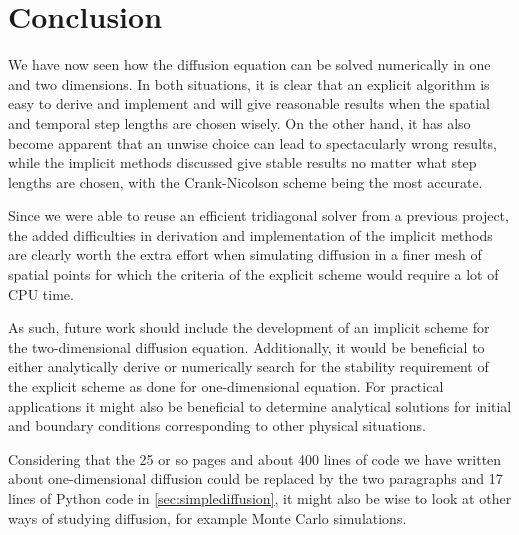 \section{Conclusion}
We have now seen how the diffusion equation can be solved numerically in one and two dimensions. In both situations, it is clear that an explicit algorithm is easy to derive and implement and will give reasonable results when the spatial and temporal step lengths are chosen wisely. On the other hand, it has also become apparent that an unwise choice can lead to spectacularly wrong results, while the implicit methods discussed give stable results no matter what step lengths are chosen, with the Crank-Nicolson scheme being the most accurate.

Since we were able to reuse an efficient tridiagonal solver from a previous project, the added difficulties in derivation and implementation of the implicit methods are clearly worth the extra effort when simulating diffusion in a finer mesh of spatial points for which the criteria of the explicit scheme would require a lot of CPU time.

As such, future work should include the development of an implicit scheme for the two-dimensional diffusion equation. Additionally, it would be beneficial to either analytically derive or numerically search for the stability requirement of the explicit scheme as done for one-dimensional equation. For practical applications it might also be beneficial to determine analytical solutions for initial and boundary conditions corresponding to other physical situations.

Considering that the 25 or so pages and about 400 lines of code we have written about one-dimensional diffusion could be replaced by the two paragraphs and 17 lines of Python code in \ref{sec:simplediffusion}, it might also be wise to look at other ways of studying diffusion, for example Monte Carlo simulations.
